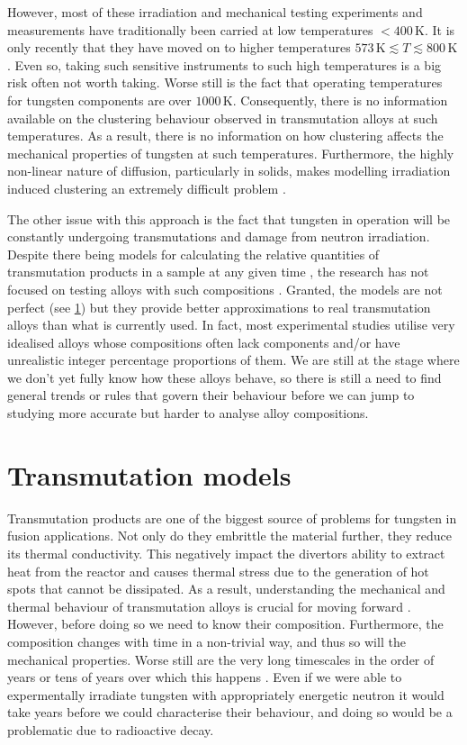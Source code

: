 \documentclass[12pt, a4paper]{article}
\begin{document}
		However, most of these irradiation and mechanical testing experiments and measurements have traditionally been carried at low temperatures $< 400\,\textrm{K}$. It is only recently that they have moved on to higher temperatures $573\,\textrm{K} \lesssim T \lesssim 800\,\textrm{K}$ \cite{ionirrmic, ionirrprop, ionirrprop2, hardening}. Even so, taking such sensitive instruments to such high temperatures is a big risk often not worth taking. Worse still is the fact that operating temperatures for tungsten components are over $1000\,\textrm{K}$. Consequently, there is no information available on the clustering behaviour observed in transmutation alloys at such temperatures. As a result, there is no information on how clustering affects the mechanical properties of tungsten at such temperatures. Furthermore, the highly non-linear nature of diffusion, particularly in solids, makes modelling irradiation induced clustering an extremely difficult problem \cite{difsol1, difsol2,modelcluster}.
		
		The other issue with this approach is the fact that tungsten in operation will be constantly undergoing transmutations and damage from neutron irradiation. Despite there being models for calculating the relative quantities of transmutation products in a sample at any given time \cite{transmute2}, the research has not focused on testing alloys with such compositions \cite{ionirrmic, ionirrprop, ionirrprop2, hardening}. Granted, the models are not perfect (see \cref{s:tm}) but they provide better approximations to real transmutation alloys than what is currently used. In fact, most experimental studies utilise very idealised alloys whose compositions often lack components and/or have unrealistic integer percentage proportions of them. We are still at the stage where we don't yet fully know how these alloys behave, so there is still a need to find general trends or rules that govern their behaviour before we can jump to studying more accurate but harder to analyse alloy compositions.
	\section{Transmutation models}\label{s:tm}
		Transmutation products are one of the biggest source of problems for tungsten in fusion applications. Not only do they embrittle the material further, they reduce its thermal conductivity. This negatively impact the divertors ability to extract heat from the reactor and causes thermal stress due to the generation of hot spots that cannot be dissipated. As a result, understanding the mechanical and thermal behaviour of transmutation alloys is crucial for moving forward \cite{transmute, nirrhard, colcas, nirrprop, nirpropmic, nirrmic,ionirrmic, ionirrprop, ionirrprop2, hardening}. However, before doing so we need to know their composition. Furthermore, the composition changes with time in a non-trivial way, and thus so will the mechanical properties. Worse still are the very long timescales in the order of years or tens of years over which this happens \cite{transmute2}. Even if we were able to expermentally irradiate tungsten with appropriately energetic neutron it would take years before we could characterise their behaviour, and doing so would be a problematic due to radioactive decay.
		
\end{document}
